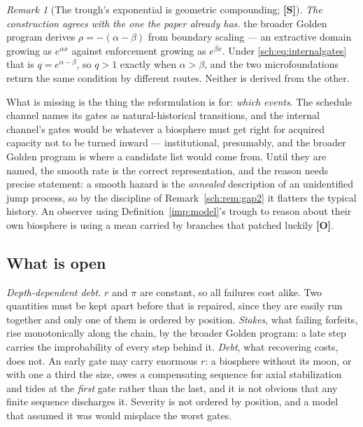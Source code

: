 \documentclass[11pt]{article}
\theoremstyle{plain}
\theoremstyle{definition}
\theoremstyle{remark}
\newtheorem{remark}[theorem]{Remark}
\begin{document}
\begin{remark}[The trough's exponential is geometric compounding;
\textbf{[S]}]
\emph{The construction agrees with the one the paper already has.}
the broader Golden program derives $\rho=-(\alpha-\beta)$ from boundary
scaling --- an extractive domain growing as $e^{\alpha x}$ against
enforcement growing as $e^{\beta x}$. Under \eqref{sch:eq:internalgates}
that is $q=e^{\alpha-\beta}$, so $q>1$ exactly when $\alpha>\beta$, and
the two microfoundations return the same condition by different routes.
Neither is derived from the other.
\end{remark}

What is missing is the thing the reformulation is for: \emph{which
events}. The schedule channel names its gates as natural-historical
transitions, and the internal channel's gates would be whatever a
biosphere must get right for acquired capacity not to be turned inward
--- institutional, presumably, and the broader Golden program is where a
candidate list would come from. Until they are named, the smooth rate is the correct representation, and the reason needs precise statement: a
smooth hazard is the \emph{annealed} description of an unidentified jump
process, so by the discipline of Remark~\ref{sch:rem:gap2} it flatters
the typical history. An observer using Definition~\ref{imp:model}'s trough to
reason about their own biosphere is using a mean carried by branches that
patched luckily \textbf{[O]}.

\subsection{What is open}\label{sch:subsub:open}

\emph{Depth-dependent debt.} $r$ and $\pi$ are constant, so all failures
cost alike. Two quantities must be kept apart before that is repaired,
since they are easily run together and only one of them is ordered by
position. \emph{Stakes}, what failing forfeits, rise monotonically
along the chain, by the broader Golden program: a late step carries
the improbability of every step behind it. \emph{Debt}, what
recovering costs, does not. An early gate may carry enormous $r$: a
biosphere without its moon, or with one a third the size, owes a
compensating sequence for axial stabilization and tides at the
\emph{first} gate rather than the last, and it is not obvious that any
finite sequence discharges it. Severity is not ordered by position, and
a model that assumed it was would misplace the worst gates.
\end{document}
